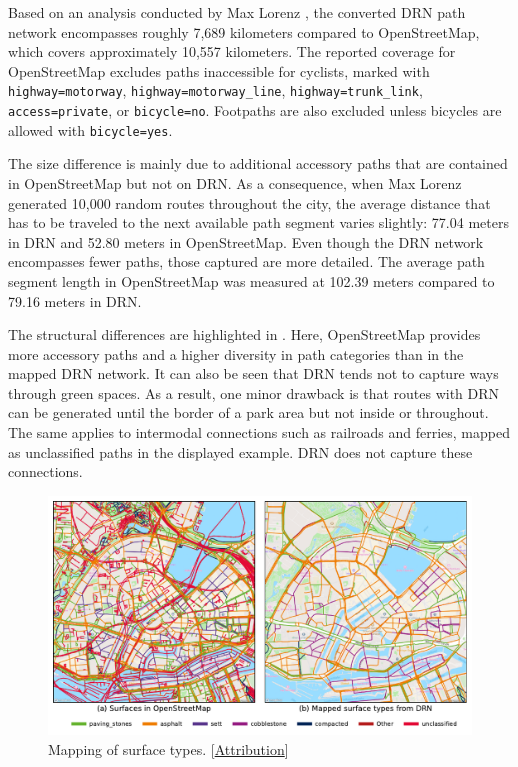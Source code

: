 Based on an analysis conducted by Max Lorenz \cite{lorenz_2022}, the converted DRN path network encompasses roughly 7,689 kilometers compared to OpenStreetMap, which covers approximately 10,557 kilometers. The reported coverage for OpenStreetMap excludes paths inaccessible for cyclists, marked with \texttt{highway=motorway}, \texttt{highway=motorway\_line}, \texttt{highway=trunk\_link}, \texttt{access=private}, or \texttt{bi\allowbreak cycle=no}. Footpaths are also excluded unless bicycles are allowed with \texttt{bicycle=yes}. 

The size difference is mainly due to additional accessory paths that are contained in OpenStreetMap but not on DRN. As a consequence, when Max Lorenz \cite{lorenz_2022} generated 10,000 random routes throughout the city, the average distance that has to be traveled to the next available path segment varies slightly: 77.04 meters in DRN and 52.80 meters in OpenStreetMap. Even though the DRN network encompasses fewer paths, those captured are more detailed. The average path segment length in OpenStreetMap was measured at 102.39 meters compared to 79.16 meters in DRN.

The structural differences are highlighted in . Here, OpenStreetMap provides more accessory paths and a higher diversity in path categories than in the mapped DRN network. It can also be seen that DRN tends not to capture ways through green spaces. As a result, one minor drawback is that routes with DRN can be generated until the border of a park area but not inside or throughout. The same applies to intermodal connections such as railroads and ferries, mapped as unclassified paths in the displayed example. DRN does not capture these connections.

\begin{figure}[t]
\centering
\includegraphics[width=\linewidth]{images/routing-drn-osm-map-surfaces.pdf} 
\caption{Mapping of surface types. [\hyperref[attribution]{Attribution}]}
\label{fig:routing-drn-osm-map-surfaces}
\end{figure}


